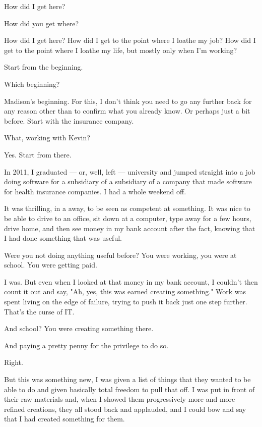 How did I get here?

\begin{ally}
How did you get where?
\end{ally}
How did I get here? How did I get to the point where I loathe my job? How did I get to the point where I loathe my life, but mostly only when I'm working?

\begin{ally}
Start from the beginning.
\end{ally}
Which beginning?

\begin{ally}
Madison's beginning. For this, I don't think you need to go any further back for any reason other than to confirm what you already know. Or perhaps just a bit before. Start with the insurance company.
\end{ally}
What, working with Kevin?

\begin{ally}
Yes. Start from there.
\end{ally}
In 2011, I graduated --- or, well, left --- university and jumped straight into a job doing software for a subsidiary of a subsidiary of a company that made software for health insurance companies. I had a whole weekend off.

It was thrilling, in a away, to be seen as competent at something. It was nice to be able to drive to an office, sit down at a computer, type away for a few hours, drive home, and then see money in my bank account after the fact, knowing that I had done something that was useful.

\begin{ally}
Were you not doing anything useful before? You were working, you were at school. You were getting paid.
\end{ally}
I was. But even when I looked at that money in my bank account, I couldn't then count it out and say, "Ah, yes, this was earned creating something." Work was spent living on the edge of failure, trying to push it back just one step further. That's the curse of IT.

\begin{ally}
And school? You were creating something there.
\end{ally}
And paying a pretty penny for the privilege to do so.

\begin{ally}
Right.
\end{ally}
But this was something new, I was given a list of things that they wanted to be able to do and given basically total freedom to pull that off. I was put in front of their raw materials and, when I showed them progressively more and more refined creations, they all stood back and applauded, and I could bow and say that I had created something for them.

